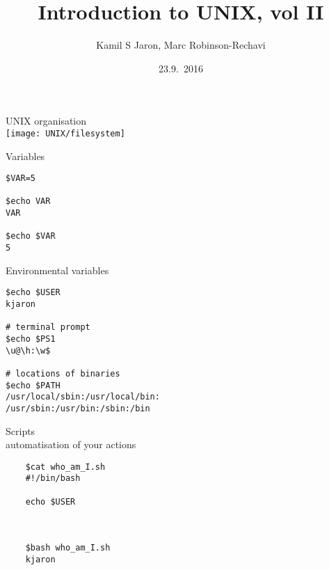 \documentclass[xcolor=dvipsnames]{beamer}
\title[ ]{Introduction to UNIX, vol II}
\author{Kamil S Jaron, Marc Robinson-Rechavi}
\date{23.9.~2016}
\begin{document}
\begin{frame}
	\titlepage
\end{frame}

\begin{frame}
	\begin{center}
		\Huge
		UNIX organisation \\
		\vspace{1cm}
		\texttt{[image: UNIX/filesystem]}
	\end{center}
\end{frame}

\begin{frame}[fragile]
	\begin{center}
		\Huge
		Variables
	\end{center}
\huge
\begin{verbatim}
$VAR=5

$echo VAR
VAR

$echo $VAR
5
\end{verbatim}
\end{frame}

\begin{frame}[fragile]
	\begin{center}
		\Huge
		Environmental variables
	\end{center}
\Large
\begin{verbatim}
$echo $USER
kjaron

# terminal prompt
$echo $PS1
\u@\h:\w$

# locations of binaries
$echo $PATH
/usr/local/sbin:/usr/local/bin:
/usr/sbin:/usr/bin:/sbin:/bin

\end{verbatim}
\end{frame}

\begin{frame}[fragile]
	\begin{center}
		\Huge
		Scripts \\
		\Large 
		automatisation of your actions
	\end{center}
\end{frame}

\begin{frame}[fragile]
\LARGE
\begin{verbatim}
	$cat who_am_I.sh
	#!/bin/bash
	
	echo $USER
	
	
	
	$bash who_am_I.sh
	kjaron
\end{verbatim}
\end{frame}
\end{document}
